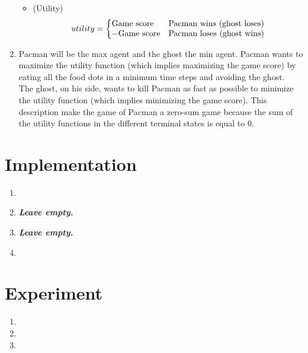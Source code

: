 \documentclass{article}
\begin{document}
\begin{enumerate}[label=\alph*.,leftmargin=*]
\begin{itemize}
			\item (Utility) \begin{equation}
  										utility=\left\{
    										\begin{array}{@{} l c @{}}
      											\text{Game score} & \text{Pacman wins (ghost loses)}\\
      											-\text{Game score} & \text{Pacman loses (ghost wins)}
    										\end{array}\right.
  										\label{eq4}
									\end{equation}
    	\end{itemize}
    	
    \item Pacman will be the max agent and the ghost the min agent. Pacman wants to maximize the utility function (which implies maximizing the game score) by eating all the food dots in a minimum time steps and avoiding the ghost.\\
          The ghost, on his side, wants to kill Pacman as fast as possible to minimize the utility function (which implies minimizing the game score). This description make the game of Pacman a zero-sum game because the sum of the utility functions in the different terminal states is equal to 0.
\end{enumerate}

\section{Implementation}

\begin{enumerate}[label=\alph*.,leftmargin=*]
    \item
    \item \textbf{\textit{Leave empty.}}
    \item \textbf{\textit{Leave empty.}}
    \item
\end{enumerate}

\section{Experiment}

\begin{enumerate}[label=\alph*.,leftmargin=*]
    \item
    \item
    \item
\end{enumerate}



\end{document}
